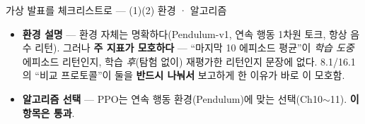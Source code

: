 \begin{frame}{가상 발표를 체크리스트로 — (1)(2) 환경 · 알고리즘}
  \small
  \begin{itemize}
    \item \textbf{환경 설명} — 환경 자체는 명확하다(Pendulum-v1, 연속
      행동 1차원 토크, 항상 음수 리턴). 그러나 \textbf{주 지표가
      모호하다} — ``마지막 10 에피소드 평균''이 \emph{학습 도중} 에피소드
      리턴인지, 학습 \emph{후}(탐험 없이) 재평가한 리턴인지 문장에
      없다. 8.1/16.1의 ``비교 프로토콜''이 둘을 \textbf{반드시
      나눠서} 보고하게 한 이유가 바로 이 모호함.
    \item \textbf{알고리즘 선택} — PPO는 연속 행동 환경(Pendulum)에
      맞는 선택(Ch10$\sim$11). \textbf{이 항목은 통과}.
  \end{itemize}
\end{frame}

